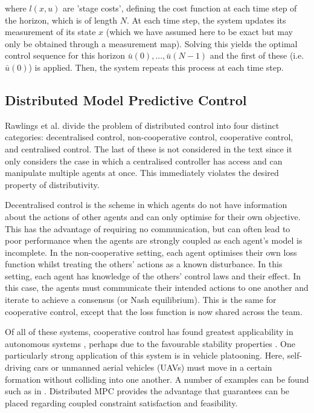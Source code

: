 \documentclass[.../main.tex]{subfiles}
\begin{document}
where $l(x, u)$ are 'stage costs', defining the cost function at each time step of the horizon,
which is of length $N$. At each time step, the system updates its measurement of its state $x$ 
(which we have assumed here to be exact but may only be obtained through a measurement map). Solving
this yields the optimal control sequence for this horizon $\bar{u}(0), ... , \bar{u}(N-1)$ and the
first of these (i.e. $\bar{u}(0)$) is applied. Then, the system repeats this process at each time
step.


\subsection{Distributed Model Predictive Control} \label{sec::Distributed_MPC}

Rawlings et al. \cite{rawlings2017model} divide the problem of distributed control into four distinct
categories: decentralised control, non-cooperative control, cooperative control, and centralised
control. The last of these is not considered in the text since it only considers the case in which a
centralised controller has access and can manipulate multiple agents at once. This immediately
violates the desired property of distributivity.

Decentralised control is the scheme in which agents do not have information about the actions of
other agents and can only optimise for their own objective. This has the advantage of requiring no
communication, but can often lead to poor performance when the agents are strongly coupled as each
agent’s model is incomplete. In the non-cooperative setting, each agent optimises their own loss
function whilst treating the others’ actions as a known disturbance. In this setting, each agent has
knowledge of the others’ control laws and their effect. In this case, the agents must communicate
their intended actions to one another and iterate to achieve a consensus (or Nash equilibrium). This
is the same for cooperative control, except that the loss function is now shared across the team. 

Of all of these systems, cooperative control has found greatest applicability in autonomous systems
\cite{Negenborn2014}, perhaps due to the favourable stability properties \cite{Venkat2006}. One
particularly strong application of this system is in vehicle platooning. Here, self-driving cars or
unmanned aerial vehicles (UAVs) must move in a certain formation without colliding into one another.
A number of examples can be found such as in \cite{Liu2019, VanParys2017, Zheng2017}. Distributed
MPC provides the advantage that guarantees can be placed regarding coupled constraint satisfaction
and feasibility.
\end{document}
